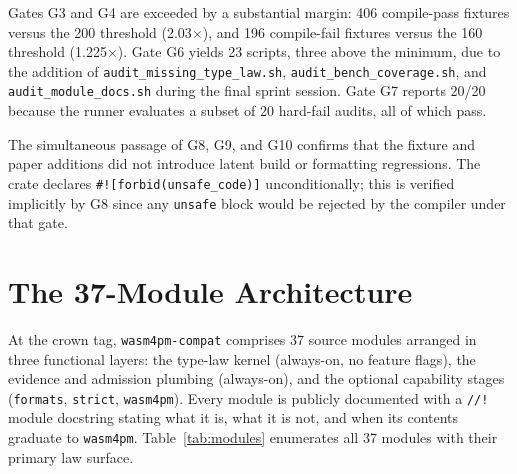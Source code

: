 Gates G3 and G4 are exceeded by a substantial margin: 406 compile-pass fixtures
versus the 200 threshold (2.03$\times$), and 196 compile-fail fixtures versus
the 160 threshold (1.225$\times$). Gate G6 yields 23 scripts, three above the
minimum, due to the addition of \texttt{audit\_missing\_type\_law.sh},
\texttt{audit\_bench\_coverage.sh}, and \texttt{audit\_module\_docs.sh} during
the final sprint session. Gate G7 reports 20/20 because the runner evaluates a
subset of 20 hard-fail audits, all of which pass.

The simultaneous passage of G8, G9, and G10 confirms that the fixture and paper
additions did not introduce latent build or formatting regressions. The crate
declares \texttt{\#![forbid(unsafe\_code)]} unconditionally; this is verified
implicitly by G8 since any \texttt{unsafe} block would be rejected by the
compiler under that gate.

\section{The 37-Module Architecture}
\label{sec:crown-modules}

At the crown tag, \texttt{wasm4pm-compat} comprises 37 source modules arranged
in three functional layers: the type-law kernel (always-on, no feature flags),
the evidence and admission plumbing (always-on), and the optional capability
stages (\texttt{formats}, \texttt{strict}, \texttt{wasm4pm}). Every module is
publicly documented with a \texttt{//!} module docstring stating what it is,
what it is not, and when its contents graduate to \texttt{wasm4pm}. Table~\ref{tab:modules}
enumerates all 37 modules with their primary law surface.

